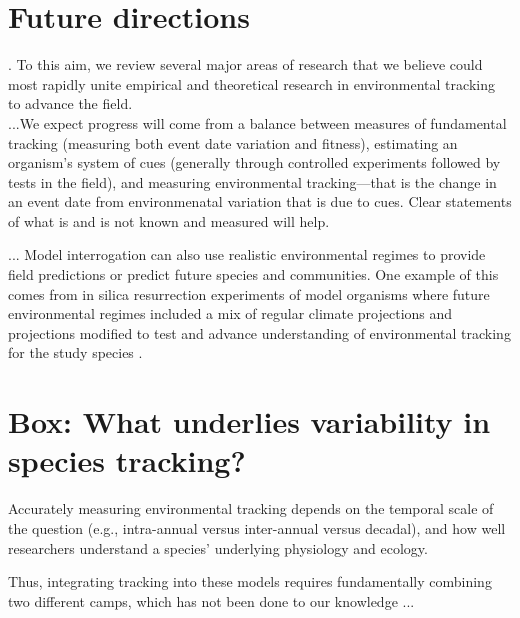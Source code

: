 \documentclass[11pt,letterpaper]{article}
\begin{document}
\section{Future directions}
. To this aim, we review several major areas of research that we believe could most rapidly unite empirical and theoretical research in environmental tracking to advance the field.\\ %


...We expect progress will come from a balance between measures of fundamental tracking (measuring both event date variation and fitness), estimating an organism's system of cues (generally through controlled experiments followed by tests in the field), and measuring environmental tracking---that is the change in an event date from environmenatal variation that is due to cues.  Clear statements of what is and is not known and measured will help. 


... Model interrogation can also use realistic environmental regimes to provide field predictions \citep{Wilczek:2010ad,Wilczek:2009oa} or predict future species and communities. One example of this comes from in silica resurrection experiments of model organisms where future environmental regimes included a mix of regular climate projections and projections modified to test and advance understanding of environmental tracking for the study species \citep[e.g., warmer winter and altered photoperiod scenarios in][]{fournier2016}.\\

\section{Box: What underlies variability in species tracking?}


Accurately measuring environmental tracking depends on the temporal scale of the question (e.g., intra-annual versus inter-annual versus decadal), and how well researchers understand a species' underlying physiology and ecology. 

Thus, integrating tracking into these models requires fundamentally combining two different camps, which has not been done to our knowledge ... 
\end{document}
